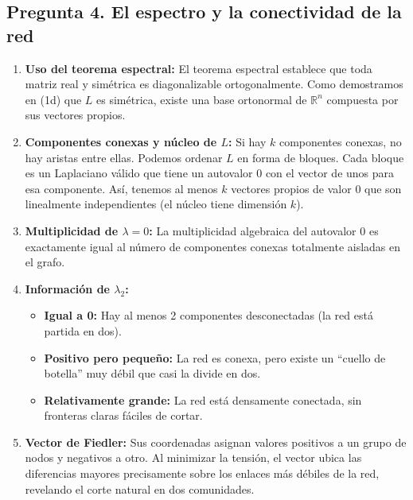 \documentclass{article}
\begin{document}
	\subsection*{Pregunta 4. El espectro y la conectividad de la red}
	\begin{enumerate}[label=\alph*)]
		\item \textbf{Uso del teorema espectral:} El teorema espectral establece que toda matriz real y simétrica es diagonalizable ortogonalmente. Como demostramos en (1d) que \(L\) es simétrica, existe una base ortonormal de \(\mathbb{R}^n\) compuesta por sus vectores propios.
		
		\item \textbf{Componentes conexas y núcleo de \(L\):} Si hay \(k\) componentes conexas, no hay aristas entre ellas. Podemos ordenar \(L\) en forma de bloques. Cada bloque es un Laplaciano válido que tiene un autovalor $0$ con el vector de unos para esa componente. Así, tenemos al menos \(k\) vectores propios de valor $0$ que son linealmente independientes (el núcleo tiene dimensión \(k\)).
		
		\item \textbf{Multiplicidad de \(\lambda = 0\):} La multiplicidad algebraica del autovalor $0$ es exactamente igual al número de componentes conexas totalmente aisladas en el grafo.
		
		\item \textbf{Información de \(\lambda_2\):}
		\begin{itemize}
			\item \textbf{Igual a 0:} Hay al menos 2 componentes desconectadas (la red está partida en dos).
			\item \textbf{Positivo pero pequeño:} La red es conexa, pero existe un ``cuello de botella'' muy débil que casi la divide en dos.
			\item \textbf{Relativamente grande:} La red está densamente conectada, sin fronteras claras fáciles de cortar.
		\end{itemize}
		
		\item \textbf{Vector de Fiedler:} Sus coordenadas asignan valores positivos a un grupo de nodos y negativos a otro. Al minimizar la tensión, el vector ubica las diferencias mayores precisamente sobre los enlaces más débiles de la red, revelando el corte natural en dos comunidades.
	\end{enumerate}
	
\end{document}
